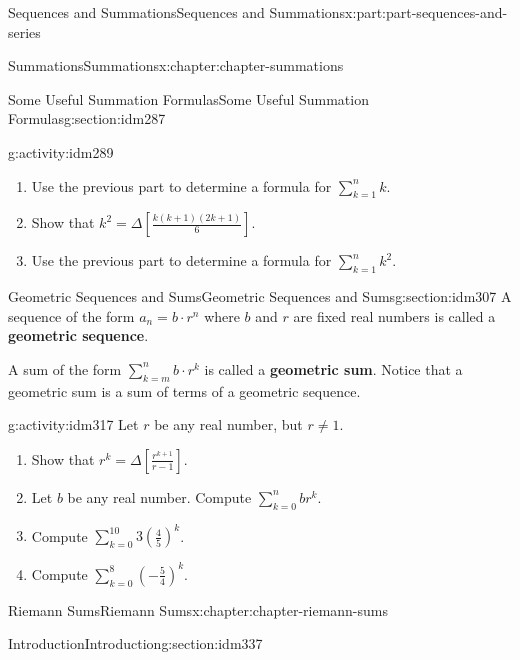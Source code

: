 \documentclass[oneside,10pt,]{book}
\newcommand{\terminology}[1]{\textbf{#1}}
\begin{document}
\begin{partptx}{Sequences and Summations}{}{Sequences and Summations}{}{}{x:part:part-sequences-and-series}
\begin{chapterptx}{Summations}{}{Summations}{}{}{x:chapter:chapter-summations}
\begin{sectionptx}{Some Useful Summation Formulas}{}{Some Useful Summation Formulas}{}{}{g:section:idm287}
\begin{activity}{}{g:activity:idm289}
\begin{enumerate}[font=\bfseries,label=(\alph*),ref=\alph*]
\item{}Use the previous part to determine a formula for \(\displaystyle\sum_{k=1}^n k\).%
\item{}Show that \(k^2 = \Delta \left[ \frac{k(k+1)(2k+1)}{6}\right]\).%
\item{}Use the previous part to determine a formula for \(\displaystyle\sum_{k=1}^n k^2\).%
\end{enumerate}
\end{activity}
\end{sectionptx}
%
%
\typeout{************************************************}
\typeout{************************************************}
%
\begin{sectionptx}{Geometric Sequences and Sums}{}{Geometric Sequences and Sums}{}{}{g:section:idm307}
A sequence of the form \(a_n = b\cdot r^n\) where \(b\) and \(r\) are fixed real numbers is called a \terminology{geometric sequence}.%
\par
A sum of the form \(\displaystyle\sum_{k=m}^n b\cdot r^k\) is called a \terminology{geometric sum}. Notice that a geometric sum is a sum of terms of a geometric sequence.%
\begin{activity}{}{g:activity:idm317}%
Let \(r\) be any real number, but \(r \neq 1\).%
\begin{enumerate}[font=\bfseries,label=(\alph*),ref=\alph*]
\item{}Show that \(\displaystyle r^k = \Delta \left[\frac{r^{k+1}}{r-1}\right]\).%
\item{}Let \(b\) be any real number. Compute \(\displaystyle\sum_{k=0}^n b r^k\).%
\item{}Compute \(\displaystyle\sum_{k=0}^{10} 3 \left(\frac{4}{5}\right)^k\).%
\item{}Compute \(\displaystyle\sum_{k=0}^8  \left(-\frac{5}{4}\right)^k\).%
\end{enumerate}
\end{activity}
\end{sectionptx}
\end{chapterptx}
%
\typeout{************************************************}
\typeout{************************************************}
%
\begin{chapterptx}{Riemann Sums}{}{Riemann Sums}{}{}{x:chapter:chapter-riemann-sums}
%
%
\typeout{************************************************}
\typeout{************************************************}
%
\begin{sectionptx}{Introduction}{}{Introduction}{}{}{g:section:idm337}

\end{sectionptx}
\end{chapterptx}
\end{partptx}
\end{document}
